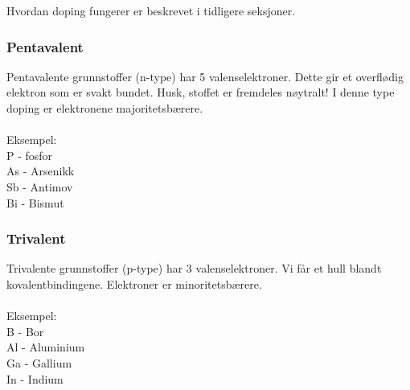 Hvordan doping fungerer er beskrevet i tidligere seksjoner.

\subsubsection{Pentavalent}
Pentavalente grunnstoffer (n-type) har 5 valenselektroner.
Dette gir et overflødig elektron som er svakt bundet.
Husk, stoffet er fremdeles nøytralt!
I denne type doping er elektronene majoritetsbærere.
\\\\
Eksempel:\\
P - fosfor\\
As - Arsenikk\\
Sb - Antimov\\
Bi - Bismut

\subsubsection{Trivalent}
Trivalente grunnstoffer (p-type) har 3 valenselektroner.
Vi får et hull blandt kovalentbindingene.
Elektroner er minoritetsbærere.
\\\\
Eksempel:\\
B - Bor\\
Al - Aluminium\\
Ga - Gallium\\
In - Indium
